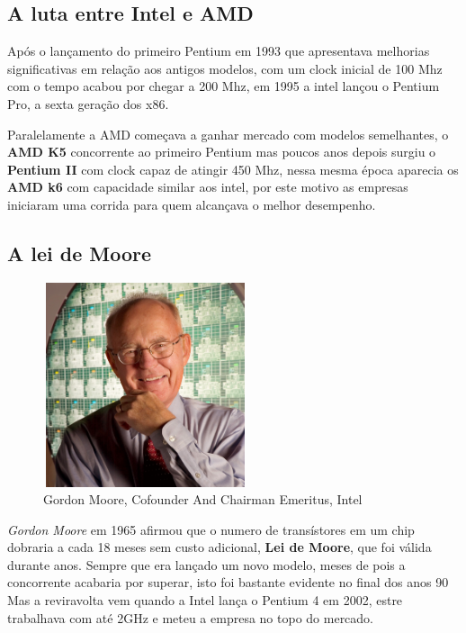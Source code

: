 \documentclass{report}
\begin{document}
\subsection{A luta entre Intel e AMD}
\label{sect.A luta entre Intel e AMD}

Após o lançamento do primeiro Pentium em 1993 que apresentava melhorias significativas em relação aos antigos modelos, com um clock inicial de 100 Mhz com o tempo acabou por chegar a 200 Mhz, em 1995 a intel lançou o Pentium Pro, a sexta geração dos x86.

Paralelamente a AMD começava a ganhar mercado com modelos semelhantes, o \textbf{AMD K5} concorrente ao primeiro Pentium mas poucos anos depois surgiu o \textbf{Pentium II} com clock capaz de atingir 450 Mhz, nessa mesma época aparecia os \textbf{AMD k6} com capacidade similar aos intel, por este motivo as empresas iniciaram uma corrida para quem alcançava o melhor desempenho.

\subsection{A lei de Moore}
\label{sect.A lei de Moore}

\begin{figure}
\center
\includegraphics[width=6cm, height=6cm]{Imagens/gordonmoore.jpg}
\caption{Gordon Moore, Cofounder And Chairman Emeritus, Intel}
\end{figure} 


\textit{Gordon Moore} em 1965 afirmou que o numero de transístores em um chip dobraria a cada 18 meses sem custo adicional, \textbf{Lei de Moore}, que foi válida durante anos. Sempre que era lançado um novo modelo, meses de pois a concorrente acabaria por superar, isto foi bastante evidente no final dos anos 90
Mas a reviravolta vem quando a Intel lança o Pentium 4 em 2002, estre trabalhava com até 2GHz e meteu a empresa no topo do mercado.
\end{document}
